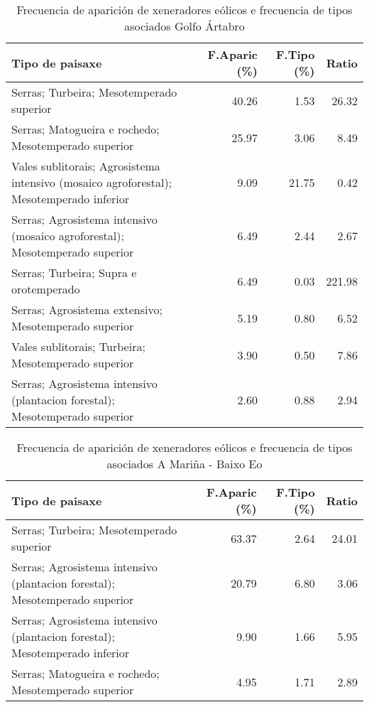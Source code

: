 \begin{table}[p]
\centering
\caption{Frecuencia de aparición de xeneradores eólicos e frecuencia de tipos asociados Golfo Ártabro} 
\label{veolico1}
\begin{tabular}{lrrr}
  \hline
Tipo de paisaxe & F.Aparic (\%) & F.Tipo (\%) & Ratio \\ 
  \hline
Serras; Turbeira; Mesotemperado superior & 40.26 & 1.53 & 26.32 \\ 
  Serras; Matogueira e rochedo; Mesotemperado superior & 25.97 & 3.06 & 8.49 \\ 
  Vales sublitorais; Agrosistema intensivo (mosaico agroforestal); Mesotemperado inferior & 9.09 & 21.75 & 0.42 \\ 
  Serras; Agrosistema intensivo (mosaico agroforestal); Mesotemperado superior & 6.49 & 2.44 & 2.67 \\ 
  Serras; Turbeira; Supra e orotemperado & 6.49 & 0.03 & 221.98 \\ 
  Serras; Agrosistema extensivo; Mesotemperado superior & 5.19 & 0.80 & 6.52 \\ 
  Vales sublitorais; Turbeira; Mesotemperado superior & 3.90 & 0.50 & 7.86 \\ 
  Serras; Agrosistema intensivo (plantacion forestal); Mesotemperado superior & 2.60 & 0.88 & 2.94 \\ 
   \hline
\end{tabular}
\end{table}
\begin{table}[p]
\centering
\caption{Frecuencia de aparición de xeneradores eólicos e frecuencia de tipos asociados A Mariña - Baixo Eo} 
\label{veolico2}
\begin{tabular}{lrrr}
  \hline
Tipo de paisaxe & F.Aparic (\%) & F.Tipo (\%) & Ratio \\ 
  \hline
Serras; Turbeira; Mesotemperado superior & 63.37 & 2.64 & 24.01 \\ 
  Serras; Agrosistema intensivo (plantacion forestal); Mesotemperado superior & 20.79 & 6.80 & 3.06 \\ 
  Serras; Agrosistema intensivo (plantacion forestal); Mesotemperado inferior & 9.90 & 1.66 & 5.95 \\ 
  Serras; Matogueira e rochedo; Mesotemperado superior & 4.95 & 1.71 & 2.89 \\ 
   \hline
\end{tabular}
\end{table}

